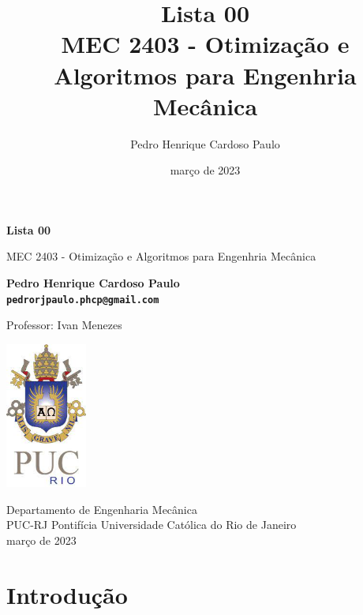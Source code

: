 \documentclass[10pt, a4paper]{article}
\begin{document}
\def\TITLE{Lista 00}
\def\DISCIPLINE{MEC 2403 - Otimização e Algoritmos para Engenhria Mecânica}
\def\PROFESSOR{Ivan Menezes}
\def\AUTHOR{Pedro Henrique Cardoso Paulo}
\def\CONTACT{pedrorjpaulo.phcp@gmail.com}
\def\DATE{março de 2023}

\title{\textbf{\TITLE} \\ \DISCIPLINE}
\author{\AUTHOR}
\date{\DATE}

\begin{titlepage}
      \begin{center}
          \vspace*{1cm}

          \Huge
          \textbf{\TITLE}

          \vspace{0.5cm}
          \LARGE
          \DISCIPLINE

          \vspace{1.5cm}

          \textbf{\AUTHOR \\ {\tt \CONTACT}}

          \vfill
          Professor: \PROFESSOR

          \vspace{0.8cm}

          \includegraphics[width=0.2\textwidth]{../general/puc.jpg}

          \Large
          Departamento de Engenharia Mecânica\\
          PUC-RJ Pontifícia Universidade Católica do Rio de Janeiro\\
          \DATE

      \end{center}
  \end{titlepage}

\maketitle

\section{Introdução}
\end{document}
